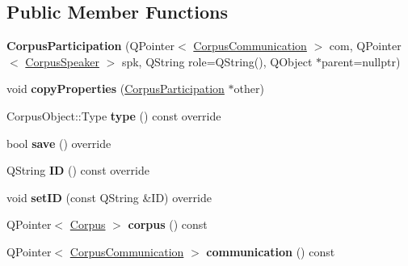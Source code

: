\subsection*{Public Member Functions}
\begin{DoxyCompactItemize}
\item 
\mbox{\label{class_corpus_participation_a611cca39bda450b00bdd96931074e70e}} 
{\bfseries Corpus\+Participation} (Q\+Pointer$<$ \hyperlink{class_corpus_communication}{Corpus\+Communication} $>$ com, Q\+Pointer$<$ \hyperlink{class_corpus_speaker}{Corpus\+Speaker} $>$ spk, Q\+String role=Q\+String(), Q\+Object $\ast$parent=nullptr)
\item 
\mbox{\label{class_corpus_participation_a3ed3ee7e6a624359ff65c6835053c33c}} 
void {\bfseries copy\+Properties} (\hyperlink{class_corpus_participation}{Corpus\+Participation} $\ast$other)
\item 
\mbox{\label{class_corpus_participation_ad8d6762d4c75d24d8f2177195ed67ab6}} 
Corpus\+Object\+::\+Type {\bfseries type} () const override
\item 
\mbox{\label{class_corpus_participation_aee623d796afe4ca06b58612e33ed0fda}} 
bool {\bfseries save} () override
\item 
\mbox{\label{class_corpus_participation_abc607ba572c0da844d19fca7b5c401ca}} 
Q\+String {\bfseries ID} () const override
\item 
\mbox{\label{class_corpus_participation_a1de7ec05fe901de7eeeefd5430e333ce}} 
void {\bfseries set\+ID} (const Q\+String \&ID) override
\item 
\mbox{\label{class_corpus_participation_aeae2f08284d743c43119f2fed9833529}} 
Q\+Pointer$<$ \hyperlink{class_corpus}{Corpus} $>$ {\bfseries corpus} () const
\item 
\mbox{\label{class_corpus_participation_afb8e1d4dfc097d2b119e528119751de7}} 
Q\+Pointer$<$ \hyperlink{class_corpus_communication}{Corpus\+Communication} $>$ {\bfseries communication} () const

\end{DoxyCompactItemize}
